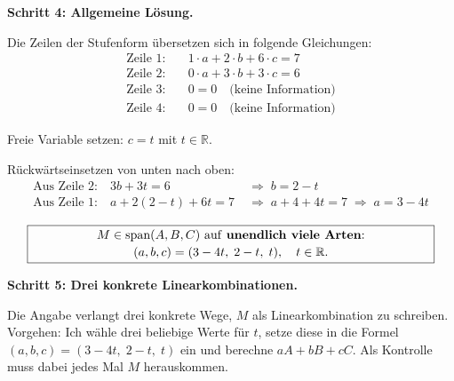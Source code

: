 \documentclass[a4paper,12pt]{article}
\begin{document}
\medskip

\textbf{Schritt 4: Allgemeine L\"osung.}

Die Zeilen der Stufenform \"ubersetzen sich in folgende Gleichungen:
\begin{align*}
\text{Zeile 1:} &\quad 1 \cdot a + 2 \cdot b + 6 \cdot c = 7 \\
\text{Zeile 2:} &\quad 0 \cdot a + 3 \cdot b + 3 \cdot c = 6 \\
\text{Zeile 3:} &\quad 0 = 0 \quad \text{(keine Information)} \\
\text{Zeile 4:} &\quad 0 = 0 \quad \text{(keine Information)}
\end{align*}

Freie Variable setzen: $c = t$ mit $t \in \mathbb{R}$.

R\"uckw\"artseinsetzen von unten nach oben:
\begin{align*}
\text{Aus Zeile 2:} \quad 3b + 3t = 6 &\;\Rightarrow\; b = 2 - t \\
\text{Aus Zeile 1:} \quad a + 2(2-t) + 6t = 7 &\;\Rightarrow\; a + 4 + 4t = 7 \;\Rightarrow\; a = 3 - 4t
\end{align*}

\[
\fbox{\parbox{0.93\textwidth}{\centering
$M \in \text{span}(A,B,C)$ auf \textbf{unendlich viele Arten}:\\[2pt]
$(a,b,c) = (3-4t,\; 2-t,\; t),\quad t \in \mathbb{R}.$
}}
\]

\textbf{Schritt 5: Drei konkrete Linearkombinationen.}

Die Angabe verlangt drei konkrete Wege, $M$ als Linearkombination zu schreiben.
Vorgehen: Ich w\"ahle drei beliebige Werte f\"ur $t$, setze diese in die Formel
$(a,b,c) = (3-4t,\; 2-t,\; t)$ ein und berechne $aA + bB + cC$.
Als Kontrolle muss dabei jedes Mal $M$ herauskommen.
\end{document}
